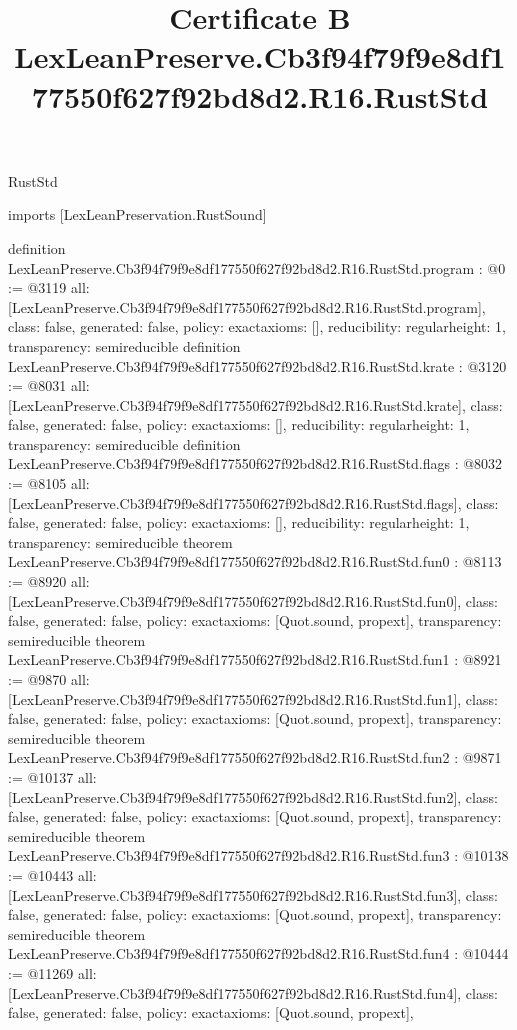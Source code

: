 \begin{lexlean}{RustStd}
\title{Certificate B LexLeanPreserve.Cb3f94f79f9e8df177550f627f92bd8d2.R16.RustStd}
\begin{coremodule}
imports [LexLeanPreservation.RustSound]

definition LexLeanPreserve.Cb3f94f79f9e8df177550f627f92bd8d2.R16.RustStd.program : @0 := @3119 {
  all: [LexLeanPreserve.Cb3f94f79f9e8df177550f627f92bd8d2.R16.RustStd.program],
  class: false,
  generated: false,
  policy: exact{axioms: []},
  reducibility: regular{height: 1},
  transparency: semireducible
}
definition LexLeanPreserve.Cb3f94f79f9e8df177550f627f92bd8d2.R16.RustStd.krate : @3120 := @8031 {
  all: [LexLeanPreserve.Cb3f94f79f9e8df177550f627f92bd8d2.R16.RustStd.krate],
  class: false,
  generated: false,
  policy: exact{axioms: []},
  reducibility: regular{height: 1},
  transparency: semireducible
}
definition LexLeanPreserve.Cb3f94f79f9e8df177550f627f92bd8d2.R16.RustStd.flags : @8032 := @8105 {
  all: [LexLeanPreserve.Cb3f94f79f9e8df177550f627f92bd8d2.R16.RustStd.flags],
  class: false,
  generated: false,
  policy: exact{axioms: []},
  reducibility: regular{height: 1},
  transparency: semireducible
}
theorem LexLeanPreserve.Cb3f94f79f9e8df177550f627f92bd8d2.R16.RustStd.fun0 : @8113 := @8920 {
  all: [LexLeanPreserve.Cb3f94f79f9e8df177550f627f92bd8d2.R16.RustStd.fun0],
  class: false,
  generated: false,
  policy: exact{axioms: [Quot.sound, propext]},
  transparency: semireducible
}
theorem LexLeanPreserve.Cb3f94f79f9e8df177550f627f92bd8d2.R16.RustStd.fun1 : @8921 := @9870 {
  all: [LexLeanPreserve.Cb3f94f79f9e8df177550f627f92bd8d2.R16.RustStd.fun1],
  class: false,
  generated: false,
  policy: exact{axioms: [Quot.sound, propext]},
  transparency: semireducible
}
theorem LexLeanPreserve.Cb3f94f79f9e8df177550f627f92bd8d2.R16.RustStd.fun2 : @9871 := @10137 {
  all: [LexLeanPreserve.Cb3f94f79f9e8df177550f627f92bd8d2.R16.RustStd.fun2],
  class: false,
  generated: false,
  policy: exact{axioms: [Quot.sound, propext]},
  transparency: semireducible
}
theorem LexLeanPreserve.Cb3f94f79f9e8df177550f627f92bd8d2.R16.RustStd.fun3 : @10138 := @10443 {
  all: [LexLeanPreserve.Cb3f94f79f9e8df177550f627f92bd8d2.R16.RustStd.fun3],
  class: false,
  generated: false,
  policy: exact{axioms: [Quot.sound, propext]},
  transparency: semireducible
}
theorem LexLeanPreserve.Cb3f94f79f9e8df177550f627f92bd8d2.R16.RustStd.fun4 : @10444 := @11269 {
  all: [LexLeanPreserve.Cb3f94f79f9e8df177550f627f92bd8d2.R16.RustStd.fun4],
  class: false,
  generated: false,
  policy: exact{axioms: [Quot.sound, propext]},
}
\end{coremodule}
\end{lexlean}
